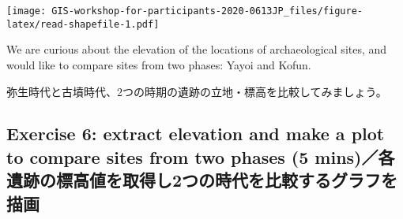 \documentclass[
  xelatex,ja=standard]{bxjsarticle}
\newenvironment{Shaded}{\begin{snugshade}}{\end{snugshade}}
\newcommand{\CommentTok}[1]{\textcolor[rgb]{0.56,0.35,0.01}{\textit{#1}}}
\newcommand{\DataTypeTok}[1]{\textcolor[rgb]{0.13,0.29,0.53}{#1}}
\newcommand{\KeywordTok}[1]{\textcolor[rgb]{0.13,0.29,0.53}{\textbf{#1}}}
\newcommand{\NormalTok}[1]{#1}
\newcommand{\OperatorTok}[1]{\textcolor[rgb]{0.81,0.36,0.00}{\textbf{#1}}}
\newcommand{\StringTok}[1]{\textcolor[rgb]{0.31,0.60,0.02}{#1}}
\begin{document}
\begin{Shaded}
\end{Shaded}

\texttt{[image: GIS-workshop-for-participants-2020-0613JP\_files/figure-latex/read-shapefile-1.pdf]}

We are curious about the elevation of the locations of archaeological
sites, and would like to compare sites from two phases: Yayoi and Kofun.

弥生時代と古墳時代、2つの時期の遺跡の立地・標高を比較してみましょう。

\hypertarget{exercise-6-extract-elevation-and-make-a-plot-to-compare-sites-from-two-phases-5-minsux5404ux907aux8de1ux306eux6a19ux9ad8ux5024ux3092ux53d6ux5f97ux30572ux3064ux306eux6642ux4ee3ux3092ux6bd4ux8f03ux3059ux308bux30b0ux30e9ux30d5ux3092ux63cfux753b}{%
\subsection{Exercise 6: extract elevation and make a plot to compare
sites from two phases (5
mins)／各遺跡の標高値を取得し2つの時代を比較するグラフを描画}\label{exercise-6-extract-elevation-and-make-a-plot-to-compare-sites-from-two-phases-5-minsux5404ux907aux8de1ux306eux6a19ux9ad8ux5024ux3092ux53d6ux5f97ux30572ux3064ux306eux6642ux4ee3ux3092ux6bd4ux8f03ux3059ux308bux30b0ux30e9ux30d5ux3092ux63cfux753b}}
\end{document}
